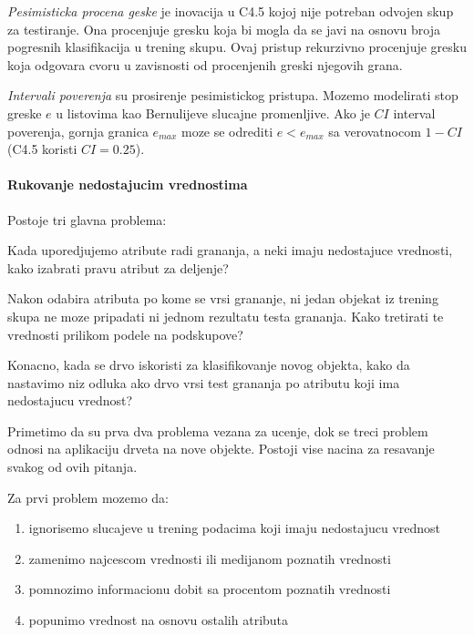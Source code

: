 \documentclass[a4paper]{article}
\begin{document}
\emph{Pesimisticka procena geske} je inovacija u C4.5 kojoj nije potreban odvojen skup za
testiranje. Ona procenjuje gresku koja bi mogla da se javi na osnovu broja pogresnih klasifikacija u
trening skupu. Ovaj pristup rekurzivno procenjuje gresku koja odgovara cvoru u zavisnosti od
procenjenih greski njegovih grana.

\emph{Intervali poverenja} su prosirenje pesimistickog pristupa. Mozemo modelirati stop greske \(e\)
u listovima  kao Bernulijeve slucajne promenljive. Ako je \(CI\) interval poverenja, gornja granica
\(e_{max}\) moze se odrediti \(e < e_{max}\) sa verovatnocom \(1-CI\) (C4.5 koristi \(CI=0.25\)).

\paragraph{Rukovanje nedostajucim vrednostima} Postoje tri glavna problema:
\begin{enumerate*}[label=(\roman*)]
    \item Kada uporedjujemo atribute radi grananja, a neki imaju nedostajuce vrednosti, kako
        izabrati pravu atribut za deljenje?
    \item Nakon odabira atributa po kome se vrsi grananje, ni jedan objekat iz trening skupa ne moze
        pripadati ni jednom rezultatu testa grananja. Kako tretirati te vrednosti prilikom podele na
        podskupove?
    \item Konacno, kada se drvo iskoristi za klasifikovanje novog objekta, kako da nastavimo niz
        odluka ako drvo vrsi test grananja po atributu koji ima nedostajucu vrednost?
\end{enumerate*}
Primetimo da su prva dva problema vezana za ucenje, dok se treci problem odnosi na aplikaciju drveta
na nove objekte. Postoji vise nacina za resavanje svakog od ovih pitanja.

Za prvi problem mozemo da:
\begin{enumerate}
    \item ignorisemo slucajeve u trening podacima koji imaju nedostajucu vrednost
    \item zamenimo najcescom vrednosti ili medijanom poznatih vrednosti
    \item pomnozimo informacionu dobit sa procentom poznatih vrednosti
    \item popunimo vrednost na osnovu ostalih atributa
\end{enumerate}
\end{document}
